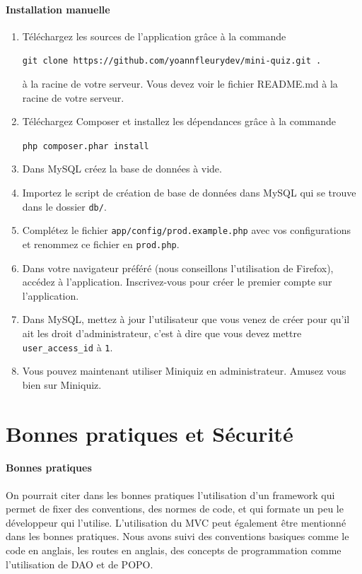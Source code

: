 \documentclass[12pt]{article}
\begin{document}
    \paragraph{Installation manuelle}
    \begin{enumerate}
        \item Téléchargez les sources de l'application grâce à la commande
        \begin{center}
            \texttt{git  clone https://github.com/yoannfleurydev/mini-quiz.git .}
        \end{center} 
        à la racine de votre serveur. Vous devez voir le fichier README.md à la racine de votre serveur. 
        \item Téléchargez Composer et installez les dépendances grâce à la commande 
        \begin{center}
            \texttt{php composer.phar install}
        \end{center}
        \item Dans MySQL créez la base de données à vide.
        \item Importez le script de création de base de données dans MySQL qui se trouve dans le dossier \texttt{db/}.
        \item Complétez le fichier \texttt{app/config/prod.example.php} avec vos configurations et renommez ce fichier en \texttt{prod.php}.
        \item Dans votre navigateur préféré (nous conseillons l'utilisation de Firefox), accédez à l'application. Inscrivez-vous pour créer le premier compte sur l'application. 
        \item Dans MySQL, mettez à jour l'utilisateur que vous venez de créer pour qu'il ait les droit d'administrateur, c'est à dire que vous devez mettre \texttt{user\_access\_id} à \texttt{1}.
        \item Vous pouvez maintenant utiliser Miniquiz en administrateur. Amusez vous bien sur Miniquiz.
    \end{enumerate}

\section{Bonnes pratiques et Sécurité}
    \paragraph{Bonnes pratiques} On pourrait citer dans les bonnes pratiques l'utilisation d'un framework qui permet de fixer des conventions, des normes de code, et qui formate un peu le développeur qui l'utilise. L'utilisation du MVC peut également être mentionné dans les bonnes pratiques. Nous avons suivi des conventions basiques comme le code en anglais, les routes en anglais, des concepts de programmation comme l'utilisation de DAO et de POPO.
\end{document}
